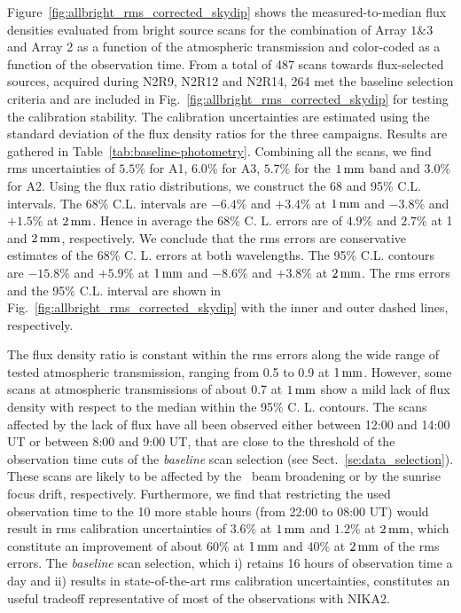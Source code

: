 Figure~\ref{fig:allbright_rms_corrected_skydip} shows the
measured-to-median flux densities evaluated from bright source scans
for the combination of Array $1\&3$ and Array 2 as a function of the
atmospheric transmission and color-coded as a function of the
observation time. From a total of 487 scans towards
flux-selected sources, acquired during N2R9, N2R12 and N2R14, 264 met
the baseline selection criteria and are included in
Fig.~\ref{fig:allbright_rms_corrected_skydip} for testing the
calibration stability. The calibration uncertainties are
estimated using the standard deviation of the flux density ratios for
the three campaigns. Results are gathered in
Table~\ref{tab:baseline-photometry}.
Combining all the scans, we find rms uncertainties of $5.5\%$ for A1,
$6.0\%$ for A3, $5.7\%$ for the $1\,\rm{mm}$ band and $3.0\%$ for A2.
{\lp Using the flux ratio distributions, we construct the 68 and 95\%
C.L. intervals. The 68\% C.L. intervals are $-6.4\%$ and $+3.4\%$ at
$1\,\rm{mm}$ and $-3.8\%$ and $+1.5\%$ at $2\, \rm{mm}$. Hence in average
the 68\% C. L. errors are of $4.9\%$ and $2.7\%$ at 1 and $2\, \rm{mm}$,
respectively. We conclude that the rms errors are conservative
estimates of the 68\% C. L. errors at both wavelengths. The 95\%
C.L. contours are $-15.8\%$ and $+5.9\%$ at $1\,\rm{mm}$ and $-8.6\%$ and
$+3.8\%$ at $2\, \rm{mm}$.
The rms errors and the 95\%
C.L. interval are shown in
Fig.~\ref{fig:allbright_rms_corrected_skydip} with the inner and
outer dashed lines, respectively.} 

The flux density ratio is constant within the rms errors along the
wide range of tested atmospheric transmission, ranging from 0.5 to 0.9
at $1\,\rm{mm}$.
However, some scans at atmospheric transmissions of about 0.7 at
$1\,\rm{mm}$ show a mild lack of flux density with respect to the
median within the 95\% C. L. contours. The scans
affected by the lack of flux have all been observed
either between 12:00 and 14:00 UT or between 8:00 and 9:00 UT,
that are close to the threshold of the observation time cuts of
the \emph{baseline} scan selection (see
Sect.~\ref{se:data_selection}). These scans are likely
to be affected by the \afternoon\ beam broadening or by the
sunrise focus drift, respectively. Furthermore, we find that restricting the
used observation time to the 10 more stable hours (from 22:00 to
08:00 UT) would result in rms calibration uncertainties of
$3.6\%$ at $1\,\rm{mm}$ and $1.2\%$ at $2\,\rm{mm}$, which constitute an
improvement of about $60\%$ at $1\,\rm{mm}$ and $40\%$ at $2\,\rm{mm}$
of the rms errors.  
The \emph{baseline} scan selection, which i)
retains 16 hours of observation time
a day and ii) %
{\lp results in state-of-the-art rms calibration
uncertainties,} constitutes {\lp an useful tradeoff representative of most
of the observations with NIKA2.} 


